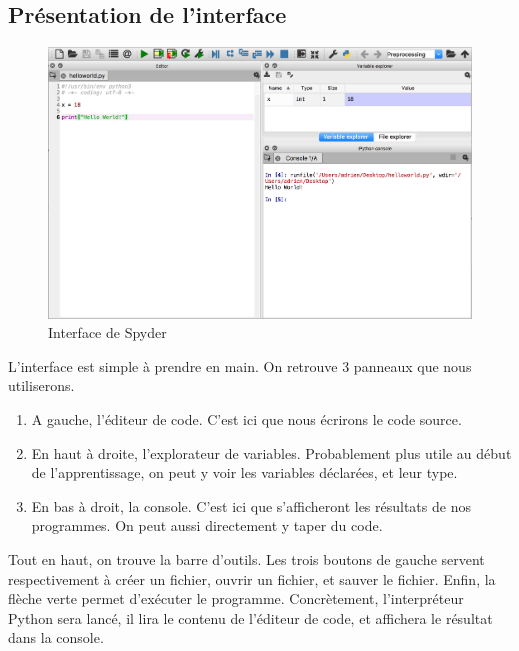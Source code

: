 \subsection{Présentation de l'interface}

\begin{figure}[h!]
\begin{center}
\includegraphics[width=15cm]{img/spyder.png}
\end{center}
\caption{Interface de Spyder}
\label{spyder}
\end{figure}

L'interface est simple à prendre en main. On retrouve 3 panneaux que nous utiliserons.
\begin{enumerate}
    \item A gauche, l'éditeur de code. C'est ici que nous écrirons le code source.
    \item En haut à droite, l'explorateur de variables. Probablement plus utile au début de l'apprentissage, on peut y voir les variables déclarées, et leur type.
    \item En bas à droit, la console. C'est ici que s'afficheront les résultats de nos programmes. On peut aussi directement y taper du code.
\end{enumerate}

Tout en haut, on trouve la barre d'outils. Les trois boutons de gauche servent respectivement à créer un fichier, ouvrir un fichier, et sauver le fichier. Enfin, la flèche verte permet d'exécuter le programme. Concrètement, l'interpréteur Python sera lancé, il lira le contenu de l'éditeur de code, et affichera le résultat dans la console.